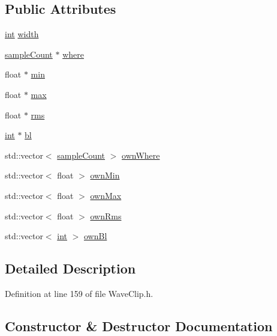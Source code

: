 \subsection*{Public Attributes}
\begin{DoxyCompactItemize}
\item 
\hyperlink{xmltok_8h_a5a0d4a5641ce434f1d23533f2b2e6653}{int} \hyperlink{class_wave_display_aab0a13074ebb8ed5ba1da2bceaddd407}{width}
\item 
\hyperlink{include_2audacity_2_types_8h_afa427e1f521ea5ec12d054e8bd4d0f71}{sample\+Count} $\ast$ \hyperlink{class_wave_display_a7e072e884092ea939899822b0d92b8be}{where}
\item 
float $\ast$ \hyperlink{class_wave_display_a9ff4ca6d4c9be28c6f3cb3f806c41913}{min}
\item 
float $\ast$ \hyperlink{class_wave_display_ab2a1f71c47f052041fbcbdac889be828}{max}
\item 
float $\ast$ \hyperlink{class_wave_display_a75d667998a5aa1ec03d1ec86b80f1392}{rms}
\item 
\hyperlink{xmltok_8h_a5a0d4a5641ce434f1d23533f2b2e6653}{int} $\ast$ \hyperlink{class_wave_display_a607b91b920b3688ea7eeb01bf302debf}{bl}
\item 
std\+::vector$<$ \hyperlink{include_2audacity_2_types_8h_afa427e1f521ea5ec12d054e8bd4d0f71}{sample\+Count} $>$ \hyperlink{class_wave_display_a931b7226e23c982bde54ddbdec6b38ec}{own\+Where}
\item 
std\+::vector$<$ float $>$ \hyperlink{class_wave_display_a0eaced19c319e8b0d37d8d20b96e6d00}{own\+Min}
\item 
std\+::vector$<$ float $>$ \hyperlink{class_wave_display_aa7ff6cb0e0e89c973cb0878aabc134c1}{own\+Max}
\item 
std\+::vector$<$ float $>$ \hyperlink{class_wave_display_af668dab41b38a1f1f4603783e4792caa}{own\+Rms}
\item 
std\+::vector$<$ \hyperlink{xmltok_8h_a5a0d4a5641ce434f1d23533f2b2e6653}{int} $>$ \hyperlink{class_wave_display_ae2f6511a16c81ed1ca2b1d87ef55560b}{own\+Bl}
\end{DoxyCompactItemize}


\subsection{Detailed Description}


Definition at line 159 of file Wave\+Clip.\+h.



\subsection{Constructor \& Destructor Documentation}
